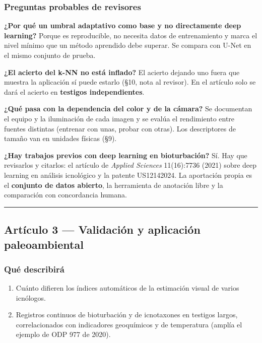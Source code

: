 \documentclass[
  10pt,
]{article}
\providecommand{\tightlist}{%
  \setlength{\itemsep}{0pt}\setlength{\parskip}{0pt}}
\begin{document}
\hypertarget{preguntas-probables-de-revisores}{%
\subsubsection{Preguntas probables de
revisores}\label{preguntas-probables-de-revisores}}

\textbf{¿Por qué un umbral adaptativo como base y no directamente deep
learning?} Porque es reproducible, no necesita datos de entrenamiento y
marca el nivel mínimo que un método aprendido debe superar. Se compara
con U-Net en el mismo conjunto de prueba.

\textbf{¿El acierto del k-NN no está inflado?} El acierto dejando uno
fuera que muestra la aplicación sí puede estarlo (§10, nota al revisor).
En el artículo solo se dará el acierto en \textbf{testigos
independientes}.

\textbf{¿Qué pasa con la dependencia del color y de la cámara?} Se
documentan el equipo y la iluminación de cada imagen y se evalúa el
rendimiento entre fuentes distintas (entrenar con unas, probar con
otras). Los descriptores de tamaño van en unidades físicas (§9).

\textbf{¿Hay trabajos previos con deep learning en bioturbación?} Sí.
Hay que revisarlos y citarlos: el artículo de \emph{Applied Sciences}
11(16):7736 (2021) sobre deep learning en análisis icnológico y la
patente US12142024. La aportación propia es el \textbf{conjunto de datos
abierto}, la herramienta de anotación libre y la comparación con
concordancia humana.

\begin{center}\rule{0.5\linewidth}{0.5pt}\end{center}

\hypertarget{artuxedculo-3-validaciuxf3n-y-aplicaciuxf3n-paleoambiental}{%
\subsection{Artículo 3 --- Validación y aplicación
paleoambiental}\label{artuxedculo-3-validaciuxf3n-y-aplicaciuxf3n-paleoambiental}}

\hypertarget{quuxe9-describiruxe1-1}{%
\subsubsection{Qué describirá}\label{quuxe9-describiruxe1-1}}

\begin{enumerate}
\def\labelenumi{\arabic{enumi}.}
\tightlist
\item
  Cuánto difieren los índices automáticos de la estimación visual de
  varios icnólogos.
\item
  Registros continuos de bioturbación y de icnotaxones en testigos
  largos, correlacionados con indicadores geoquímicos y de temperatura
  (amplía el ejemplo de ODP 977 de 2020).
\end{enumerate}
\end{document}
